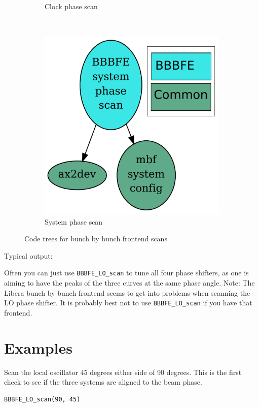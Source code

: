 \documentclass{report}
\begin{document}
\begin{figure}[hbt]
\begin{subfigure}[b]{0.3\textwidth}
        \caption{Clock phase scan}
        \label{fig:clock_phase_scan}
    \end{subfigure}
    ~ %
    \begin{subfigure}[b]{0.3\textwidth}
        \includegraphics[width=\textwidth]{BBBFE_system_phase_scan.pdf}
        \caption{System phase scan}
        \label{fig:system_phase_scan}
    \end{subfigure}
    \caption{Code trees for bunch by bunch frontend scans}\label{fig:BBBFE_code_trees}
\end{figure}

Typical output:

Often you can just use \verb|BBBFE_LO_scan| to tune all four phase shifters, as one is aiming to have the peaks of the three curves at the same phase angle.
Note: The Libera bunch by bunch frontend seems to get into problems when scanning the LO phase shifter. It is probably best not to use \verb|BBBFE_LO_scan| if you have that frontend.
\section{Examples}

Scan the local oscillator 45 degrees either side of 90 degrees. This is the first check to see if the three systems are aligned to the beam phase.
\begin{verbatim}
BBBFE_LO_scan(90, 45)
\end{verbatim}
\end{document}
